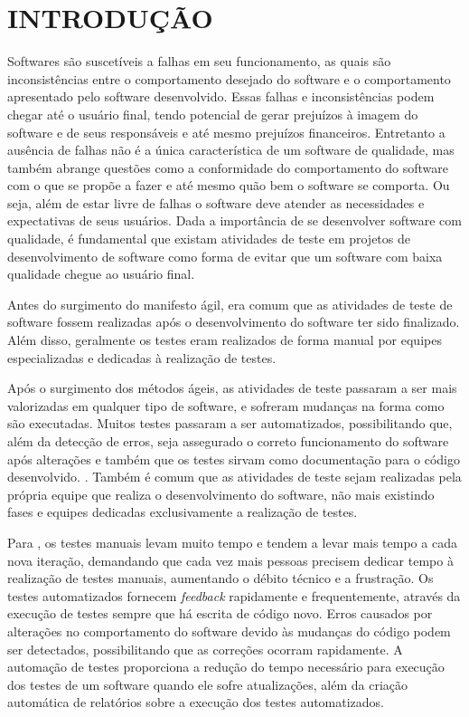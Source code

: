 
\chapter{INTRODUÇÃO}
\label{chap:introducao}

Softwares são suscetíveis a falhas em seu funcionamento, as quais são inconsistências entre o comportamento desejado do software e o comportamento apresentado pelo software desenvolvido. Essas falhas e inconsistências podem chegar até o usuário final, tendo potencial de gerar prejuízos à imagem do software e de seus responsáveis e até mesmo prejuízos financeiros. Entretanto a ausência de falhas não é a única característica de um software de qualidade, mas também abrange questões como a conformidade do comportamento do software com o que se propõe a fazer e até mesmo quão bem o software se comporta. Ou seja, além de estar livre de falhas o software deve atender as necessidades e expectativas de seus usuários. Dada a importância de se desenvolver software com qualidade, é fundamental que existam atividades de teste em projetos de desenvolvimento de software como forma de evitar que um software com baixa qualidade chegue ao usuário final.

Antes do surgimento do manifesto ágil, era comum que as atividades de teste de software fossem realizadas após o desenvolvimento do software ter sido finalizado. Além disso, geralmente os testes eram realizados de forma manual por equipes especializadas e dedicadas à realização de testes. 

Após o surgimento dos métodos ágeis, as atividades de teste passaram a ser mais valorizadas em qualquer tipo de software, e sofreram mudanças na forma como são executadas. Muitos testes passaram a ser automatizados, possibilitando que, além da detecção de erros, seja assegurado o correto funcionamento do software após alterações e também que os testes sirvam como documentação para o código desenvolvido. \cite{Valente2020}. Também é comum que as atividades de teste sejam realizadas pela própria equipe que realiza o desenvolvimento do software, não mais existindo fases e equipes dedicadas exclusivamente a realização de testes.

Para , os testes manuais levam muito tempo e tendem a levar mais tempo a cada nova iteração, demandando que cada vez mais pessoas precisem dedicar tempo à realização de testes manuais, aumentando o débito técnico e a frustração. Os testes automatizados fornecem \emph{feedback} rapidamente e frequentemente, através da execução de testes sempre que há escrita de código novo. Erros causados por alterações no comportamento do software devido às mudanças do código podem ser detectados, possibilitando que as correções ocorram rapidamente. A automação de testes proporciona a redução do tempo necessário para execução dos testes de um software quando ele sofre atualizações, além da criação automática de relatórios sobre a execução dos testes automatizados.


